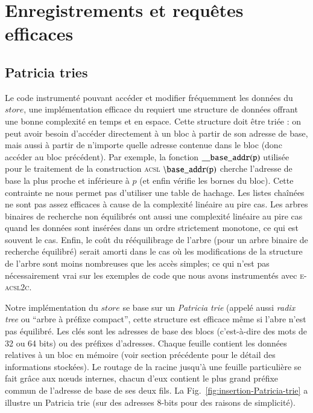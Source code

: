 \documentclass[french]{spimufcphdthesis}
\begin{document}



\section{Enregistrements et requêtes efficaces}


\subsection{Patricia tries}

Le code instrumenté pouvant accéder et modifier fréquemment les données du
$store$, une implémentation efficace du requiert une structure de données
offrant une bonne complexité en temps et en espace. Cette structure doit être
triée : on peut avoir besoin d'accéder directement à un bloc à partir de son
adresse de base, mais aussi à partir de n'importe quelle adresse contenue dans
le bloc (donc accéder au bloc précédent). Par exemple, la fonction
${\tt \_\_base\_addr(p)}$ utilisée pour le traitement de la construction
\textsc{acsl} ${\tt \backslash base\_addr(p)}$ cherche l'adresse de base la plus
proche et inférieure à $p$ (et enfin vérifie les bornes du bloc). Cette
contrainte ne nous permet pas d'utiliser une table de hachage. Les listes
chaînées ne sont pas assez efficaces à cause de la complexité linéaire au pire
cas. Les arbres binaires de recherche non équilibrés ont aussi une complexité
linéaire au pire cas quand les données sont insérées dans un ordre strictement
monotone, ce qui est souvent le cas. Enfin, le coût du rééquilibrage de l'arbre
(pour un arbre binaire de recherche équilibré) serait amorti dans le cas où les
modifications de la structure de l'arbre sont moins nombreuses que les accès
simples; ce qui n'est pas nécessairement vrai sur les exemples de code que nous
avons instrumentés avec \textsc{e-acsl2c}.

Notre implémentation du $store$ se base sur un {\em Patricia trie}
\cite{Patricia-tries} (appelé aussi {\em radix tree} ou ``arbre à préfixe
compact'', cette structure est efficace même si l'abre n'est pas équilibré.
Les clés sont les adresses de base des blocs (c'est-à-dire des mots de 32 ou 64
bits) ou des préfixes d'adresses. Chaque feuille contient les données relatives
à un bloc en mémoire (voir section précédente pour le détail des informations
stockées). Le routage de la racine jusqu'à une feuille particulière se fait
grâce aux n\oe{}uds internes, chacun d'eux contient le plus grand préfixe commun
de l'adresse de base de ses deux fils. La Fig.~\ref{fig:insertion-Patricia-trie}
a illustre un Patricia trie (sur des adresses 8-bits pour des raisons de
simplicité).
\end{document}
